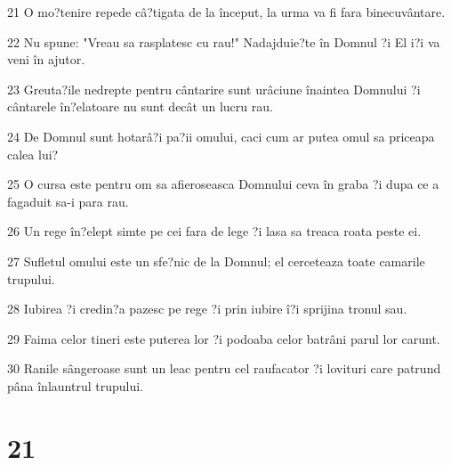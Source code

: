\par 21 O mo?tenire repede câ?tigata de la început, la urma va fi fara binecuvântare.
\par 22 Nu spune: "Vreau sa rasplatesc cu rau!" Nadajduie?te în Domnul ?i El i?i va veni în ajutor.
\par 23 Greuta?ile nedrepte pentru cântarire sunt urâciune înaintea Domnului ?i cântarele în?elatoare nu sunt decât un lucru rau.
\par 24 De Domnul sunt hotarâ?i pa?ii omului, caci cum ar putea omul sa priceapa calea lui?
\par 25 O cursa este pentru om sa afieroseasca Domnului ceva în graba ?i dupa ce a fagaduit sa-i para rau.
\par 26 Un rege în?elept simte pe cei fara de lege ?i lasa sa treaca roata peste ei.
\par 27 Sufletul omului este un sfe?nic de la Domnul; el cerceteaza toate camarile trupului.
\par 28 Iubirea ?i credin?a pazesc pe rege ?i prin iubire î?i sprijina tronul sau.
\par 29 Faima celor tineri este puterea lor ?i podoaba celor batrâni parul lor carunt.
\par 30 Ranile sângeroase sunt un leac pentru cel raufacator ?i lovituri care patrund pâna înlauntrul trupului.

\chapter{21}

